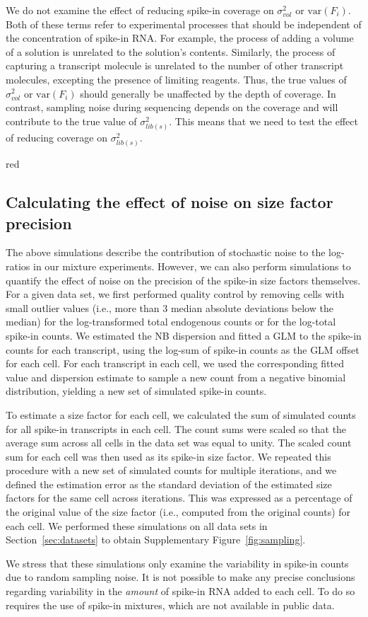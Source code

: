 \documentclass{article}
\newcommand\variance{\mbox{var}}
\begin{document}
We do not examine the effect of reducing spike-in coverage on $\sigma^2_{vol}$ or $\variance(F_i)$.
Both of these terms refer to experimental processes that should be independent of the concentration of spike-in RNA.
For example, the process of adding a volume of a solution is unrelated to the solution's contents.
Similarly, the process of capturing a transcript molecule is unrelated to the number of other transcript molecules, excepting the presence of limiting reagents.
Thus, the true values of $\sigma^2_{vol}$ or $\variance(F_i)$ should generally be unaffected by the depth of coverage.
In contrast, sampling noise during sequencing depends on the coverage and will contribute to the true value of $\sigma^2_{lib(s)}$.
This means that we need to test the effect of reducing coverage on $\sigma^2_{lib(s)}$.

\begin{color}{red}
\subsection{Calculating the effect of noise on size factor precision}
The above simulations describe the contribution of stochastic noise to the log-ratios in our mixture experiments.
However, we can also perform simulations to quantify the effect of noise on the precision of the spike-in size factors themselves.
For a given data set, we first performed quality control by removing cells with small outlier values (i.e., more than 3 median absolute deviations below the median) for the log-transformed total endogenous counts or for the log-total spike-in counts.
We estimated the NB dispersion and fitted a GLM to the spike-in counts for each transcript, using the log-sum of spike-in counts as the GLM offset for each cell.
For each transcript in each cell, we used the corresponding fitted value and dispersion estimate to sample a new count from a negative binomial distribution, yielding a new set of simulated spike-in counts.

To estimate a size factor for each cell, we calculated the sum of simulated counts for all spike-in transcripts in each cell.
The count sums were scaled so that the average sum across all cells in the data set was equal to unity.
The scaled count sum for each cell was then used as its spike-in size factor.
We repeated this procedure with a new set of simulated counts for multiple iterations, and we defined the estimation error as the standard deviation of the estimated size factors for the same cell across iterations. 
This was expressed as a percentage of the original value of the size factor (i.e., computed from the original counts) for each cell.
We performed these simulations on all data sets in Section~\ref{sec:datasets} to obtain Supplementary Figure~\ref{fig:sampling}.

We stress that these simulations only examine the variability in spike-in counts due to random sampling noise. 
It is not possible to make any precise conclusions regarding variability in the \textit{amount} of spike-in RNA added to each cell.
To do so requires the use of spike-in mixtures, which are not available in public data.
\end{color}
\end{document}
